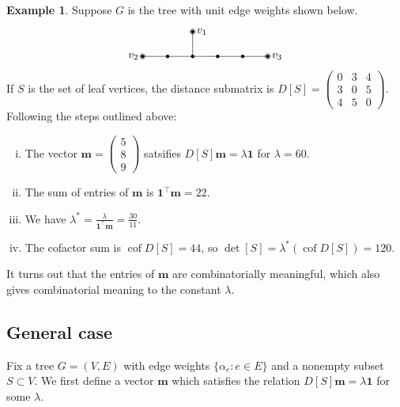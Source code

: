 \documentclass{amsart}
\theoremstyle{definition}
\newtheorem{eg}[thm]{Example}
\newcommand{\bone}{\mathbf{1}}
\newcommand{\boldm}{\mathbf{m}}
\newcommand{\tr}{\intercal}
\DeclareMathOperator{\cof}{cof}
\begin{document}
\begin{eg}
Suppose $G$ is the tree with unit edge weights shown below.
\[
\begin{tikzpicture}[scale=0.8]
	\coordinate (1) at (0,0);
	\coordinate (A) at (1,0);
	\coordinate (B) at (2,0);
	\coordinate (C) at (3,0);
	\coordinate (D) at (4,0);
	\coordinate (2) at (5,0);
	\coordinate (3) at (2,1);
	
	\foreach \c in {1,2,3,A,B,C,D} {
		\fill (\c) circle (2pt);
	}
	\foreach \c in {1,2,3} {
		\draw (\c) circle (3pt);
	}

	\draw (1) -- (A);
	\draw (A) -- (B);
	\draw (B) -- (3);
	\draw (B) -- (C);
	\draw (C) -- (D);
	\draw (D) -- (2);
	
	\foreach \c/\d/\label in {1/left/v_2,2/right/v_3,3/right/v_1} {
		\node[\d=0.2] at (\c) {$\label$};
	}
\end{tikzpicture}
\]
If $S$ is the set of leaf vertices, the distance submatrix is 
$
D[S] = \begin{pmatrix}
0 & 3 & 4 \\
3 & 0 & 5 \\
4 & 5 & 0
\end{pmatrix}.
$
Following the steps outlined above:
\begin{enumerate}[(i)]
\item 
The vector $\boldm = \begin{pmatrix} 5 \\ 8 \\ 9 \end{pmatrix}$
satsifies $D[S] \boldm = \lambda \bone$ for $\lambda = 60$.

\item 
The sum of entries of $\boldm$ is $\bone^\tr \boldm = 22$.

\item 
We have $\displaystyle \lambda^* = \frac{\lambda}{\bone^\tr \boldm} = \frac{30}{11}$.

\item 
The cofactor sum is $\cof D[S] = 44$, so $\det[S] = \lambda^*(\cof D[S]) = 120$.
\end{enumerate}
\end{eg}
It turns out that the entries of $\boldm$ are combinatorially meaningful,
which also gives combinatorial meaning to
the constant $\lambda$.

\subsection{General case}
Fix a tree $G = (V,E)$ with edge weights $\{\alpha_e : e \in E\}$ and a nonempty subset $S \subset V$.
We first define a vector $\boldm$ which satisfies the relation $D[S] \boldm = \lambda \bone$ for some $\lambda$.
\end{document}
